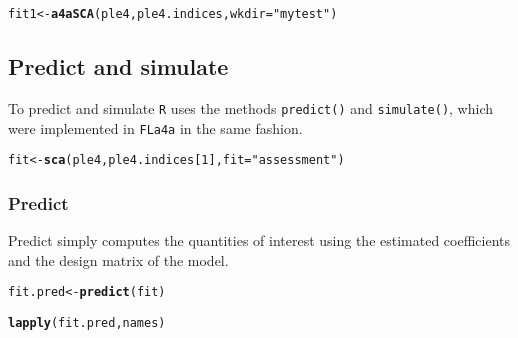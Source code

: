 \documentclass[a4paper,english,10pt]{article}\usepackage[]{graphicx}\usepackage[]{color}
\makeatletter
\newcommand{\hlnum}[1]{\textcolor[rgb]{0.686,0.059,0.569}{#1}}%
\newcommand{\hlstr}[1]{\textcolor[rgb]{0.192,0.494,0.8}{#1}}%
\newcommand{\hlstd}[1]{\textcolor[rgb]{0.345,0.345,0.345}{#1}}%
\newcommand{\hlkwb}[1]{\textcolor[rgb]{0.69,0.353,0.396}{#1}}%
\newcommand{\hlkwc}[1]{\textcolor[rgb]{0.333,0.667,0.333}{#1}}%
\newcommand{\hlkwd}[1]{\textcolor[rgb]{0.737,0.353,0.396}{\textbf{#1}}}%
\newenvironment{kframe}{%
 \def\at@end@of@kframe{}%
 \ifinner\ifhmode%
  \def\at@end@of@kframe{\end{minipage}}%
  \begin{minipage}{\columnwidth}%
 \fi\fi%
 \def\FrameCommand##1{\hskip\@totalleftmargin \hskip-\fboxsep
 \colorbox{shadecolor}{##1}\hskip-\fboxsep
     \hskip-\linewidth \hskip-\@totalleftmargin \hskip\columnwidth}%
 \MakeFramed {\advance\hsize-\width
   \@totalleftmargin\z@ \linewidth\hsize
   \@setminipage}}%
 {\par\unskip\endMakeFramed%
 \at@end@of@kframe}
\newenvironment{knitrout}{}{} %
\newcommand{\code}[1]{{\texttt{#1}}}
\newcommand{\pkg}[1]{{\texttt{#1}}}
\makeatother
\begin{document}
\begin{knitrout}
\color{fgcolor}\begin{kframe}
\begin{alltt}
\hlstd{fit1} \hlkwb{<-} \hlkwd{a4aSCA}\hlstd{(ple4, ple4.indices,} \hlkwc{wkdir}\hlstd{=}\hlstr{"mytest"}\hlstd{)}
\end{alltt}


{\ttfamily\noindent\bfseries{}}\end{kframe}
\end{knitrout}

\subsection{Predict and simulate}

To predict and simulate \pkg{R} uses the methods \code{predict()} and \code{simulate()}, which were implemented in \pkg{FLa4a} in the same fashion.

\begin{knitrout}
\color{fgcolor}\begin{kframe}
\begin{alltt}
\hlstd{fit} \hlkwb{<-} \hlkwd{sca}\hlstd{(ple4, ple4.indices[}\hlnum{1}\hlstd{],} \hlkwc{fit}\hlstd{=}\hlstr{"assessment"}\hlstd{)}
\end{alltt}


{\ttfamily\noindent\bfseries{}}\end{kframe}
\end{knitrout}

\subsubsection{Predict}

Predict simply computes the quantities of interest using the estimated coefficients and the design matrix of the model.

\begin{knitrout}
\color{fgcolor}\begin{kframe}
\begin{alltt}
\hlstd{fit.pred} \hlkwb{<-} \hlkwd{predict}\hlstd{(fit)}
\end{alltt}


{\ttfamily\noindent\bfseries\color{errorcolor}{\#\# Error: object 'fit' not found}}\begin{alltt}
\hlkwd{lapply}\hlstd{(fit.pred, names)}
\end{alltt}


{\ttfamily\noindent\bfseries\color{errorcolor}{\#\# Error: object 'fit.pred' not found}}\end{kframe}
\end{knitrout}
\end{document}
